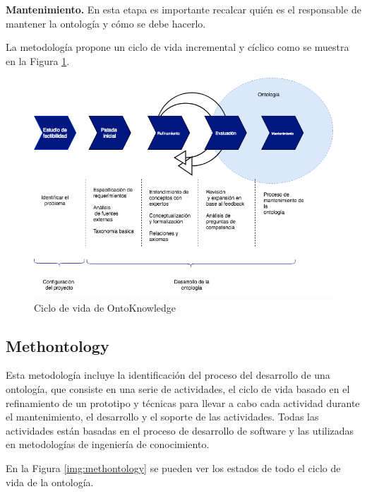\textbf{Mantenimiento.} En esta etapa es importante recalcar quién es el responsable de mantener la ontología y cómo se debe hacerlo.

La metodología propone un ciclo de vida incremental y cíclico como se muestra en la Figura \ref{img:ontoknowledge}.

\begin{figure}[h!]
    \centering
    \includegraphics[width=150mm]{figuras/Diagramas-OntoKnowledgeProcess}
    \caption{Ciclo de vida de OntoKnowledge}
    \label{img:ontoknowledge}
    \end{figure}

\subsection{Methontology}

Esta metodología incluye la identificación del proceso del desarrollo de una ontología, que consiste en una serie de actividades, el ciclo de vida basado en el refinamiento de un prototipo y técnicas para llevar a cabo cada actividad durante el mantenimiento, el desarrollo y el soporte de las actividades. Todas las actividades están basadas en el proceso de desarrollo de software y las utilizadas en metodologías de ingeniería de conocimiento.

En la Figura \ref{img:methontology} se pueden ver los estados de todo el ciclo de vida de la ontología.

